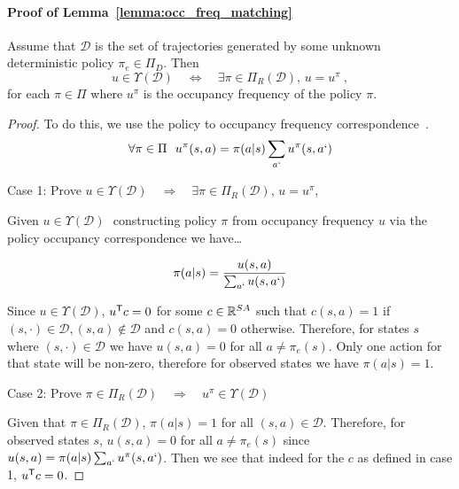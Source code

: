 \documentclass[11pt]{article}
\begin{document}
\paragraph{Proof of Lemma~\ref{lemma:occ_freq_matching}}
Assume that $\mathcal{D}$ is the set of trajectories generated by some unknown deterministic policy $\pi_e \in \Pi_D$. Then
\[
	u \in \Upsilon (\mathcal{D})  \quad \Leftrightarrow \quad  \exists \pi \in \Pi_R(\mathcal{D}), \, u = u^{\pi}~,
\]
for each $\pi \in \Pi$ where $u^{\pi}$ is the occupancy frequency of the policy $\pi$.
\begin{proof}
	To do this, we use the policy to occupancy frequency correspondence~\cite{PUTERMAN}.
	\[\forall \pi \in \Pi \,\,\,\, u^\pi(s,a) = \pi(a|s)\sum_{a`}{u^\pi(s,a`)}\]

	Case 1: Prove $u \in \Upsilon (\mathcal{D})  \quad \Rightarrow \quad  \exists
		\pi \in \Pi_R(\mathcal{D}), \, u = u^{\pi}$,

	Given $u \in \Upsilon (\mathcal{D})\,\,$ constructing policy $\pi$ from
	occupancy frequency $u$ via the policy occupancy correspondence we have\dots

	\[\pi(a|s) = \frac{u(s,a)}{\sum_{a`}u(s,a`)}\]

	Since $u \in \Upsilon (\mathcal{D})$, $u^{\mathsf{T}} c = 0$ for some $c \in \mathbb{R}^{SA}$ such that 
	$c(s,a) = 1$ if $(s,\cdot) \in \mathcal{D}, (s,a) \notin \mathcal{D}$ and $c(s,a) = 0$ otherwise. 
	Therefore, for states $s$ where $(s,\cdot) \in \mathcal{D}$ we have $u(s,a) = 0$ for all $a \not= \pi_e(s)$.
	Only one action for that state will be non-zero, therefore for observed states we have $\pi(a|s) = 1$.

	Case 2: Prove $\pi \in \Pi_R(\mathcal{D}) \quad \Rightarrow \quad  u^\pi \in
		\Upsilon (\mathcal{D})$

	Given that $\pi \in \Pi_R(\mathcal{D})$, $\pi(a|s) = 1$ for all $(s,a) \in \mathcal{D}$. Therefore, for observed states $s$, $u(s,a) = 0$ for all $a \not= \pi_e(s)$
	since $u(s,a) = \pi(a|s)\sum_{a`}{u^\pi(s,a`)}$. Then we see that indeed for the $c$ as defined in case 1, $u^{\mathsf{T}} c = 0$.
\end{proof}
\end{document}
